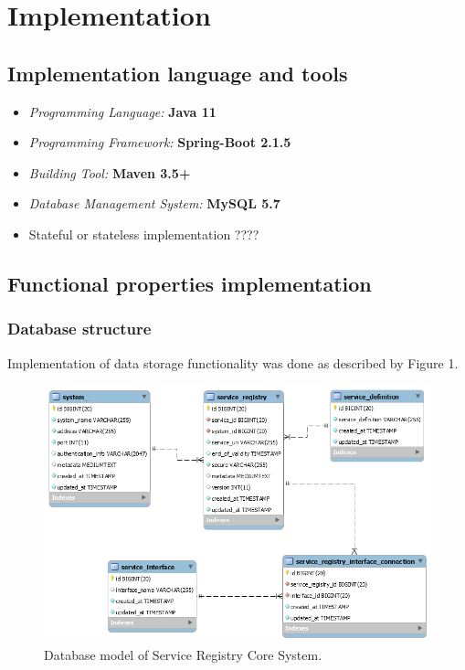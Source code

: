 \documentclass[a4paper]{arrowhead}
\begin{document}
\newpage

\section{Implementation}
\label{Implementation}

\subsection {Implementation language and tools}

\begin{itemize}
\item \emph{Programming Language:} \textbf{Java 11}
\item \emph{Programming Framework:} \textbf{Spring-Boot 2.1.5}
\item \emph{Building Tool:} \textbf{Maven 3.5+}
\item \emph{Database Management System:} \textbf{MySQL 5.7}
\color{red}
\item Stateful or stateless implementation ???? 
\end{itemize} 
\color{black}

\subsection {Functional properties implementation}

\subsubsection{Database structure}

Implementation of data storage functionality was done as described by Figure 1.

\begin{figure}[h!]
  \centering
  \includegraphics[width=\textwidth]{figures/serviceregistry_database_model}
  \caption{
    Database model of Service Registry Core System.
  }
  \label{fig:model_overview}
\end{figure}
\end{document}
